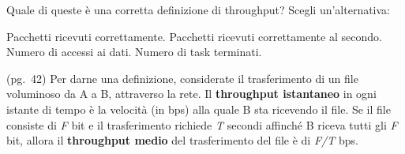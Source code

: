 \question
Quale di queste è una corretta definizione di throughput?
Scegli un'alternativa:

\begin{checkboxes}
	\choice Pacchetti ricevuti correttamente.
	\CorrectChoice Pacchetti ricevuti correttamente al secondo.
	\choice Numero di accessi ai dati.
	\choice Numero di task terminati.
\end{checkboxes}

\begin{solution}
(pg.\ 42)
Per darne una definizione, considerate il trasferimento di un file voluminoso da A a B, attraverso la rete.
Il \textbf{throughput istantaneo} in ogni istante di tempo è la velocità (in bps) alla quale B sta ricevendo il file.
Se il file consiste di \emph{F} bit e il trasferimento richiede \emph{T} secondi affinché B riceva tutti gli \emph{F} bit, allora il \textbf{throughput medio} del trasferimento del file è di \emph{F/T} bps.
\end{solution}
